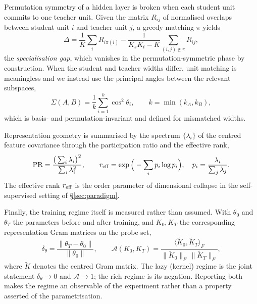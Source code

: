 Permutation symmetry of a hidden layer is broken when each student unit commits
to one teacher unit. Given the matrix $R_{ij}$ of normalised overlaps between
student unit $i$ and teacher unit $j$, a greedy matching $\pi$ yields
\begin{equation}
  \Delta=\frac{1}{K}\sum_{i}R_{i\pi(i)}
        -\frac{1}{K_sK_t-K}\sum_{(i,j)\notin\pi}R_{ij},
  \label{eq:specgap}
\end{equation}
the \emph{specialisation gap}, which vanishes in the permutation-symmetric
phase by construction. When the student and teacher widths differ, unit
matching is meaningless and we instead use the principal angles between the
relevant subspaces,
\begin{equation}
  \Sigma(A,B)=\frac{1}{k}\sum_{i=1}^{k}\cos^2\theta_i,
  \qquad k=\min(k_A,k_B),
  \label{eq:subspace}
\end{equation}
which is basis- and permutation-invariant and defined for mismatched widths.

Representation geometry is summarised by the spectrum $\{\lambda_i\}$ of the
centred feature covariance through the participation ratio and the effective
rank,
\begin{equation}
  \mathrm{PR}=\frac{\big(\sum_i\lambda_i\big)^2}{\sum_i\lambda_i^2},
  \qquad
  r_{\rm eff}=\exp\Big(-\sum_i p_i\log p_i\Big),\quad
  p_i=\frac{\lambda_i}{\sum_j\lambda_j}.
  \label{eq:effrank}
\end{equation}
The effective rank $r_{\rm eff}$ is the order parameter of dimensional collapse
in the self-supervised setting of \S\ref{sec:paradigm}.

Finally, the training regime itself is measured rather than assumed. With
$\theta_0$ and $\theta_T$ the parameters before and after training, and
$K_0,K_T$ the corresponding representation Gram matrices on the probe set,
\begin{equation}
  \delta_\theta=\frac{\lVert\theta_T-\theta_0\rVert}{\lVert\theta_0\rVert},
  \qquad
  \mathcal A(K_0,K_T)=
  \frac{\langle \tilde K_0,\tilde K_T\rangle_F}
       {\lVert \tilde K_0\rVert_F\,\lVert \tilde K_T\rVert_F},
  \label{eq:lazy}
\end{equation}
where $\tilde K$ denotes the centred Gram matrix. The lazy (kernel) regime is
the joint statement $\delta_\theta\to0$ and $\mathcal A\to1$; the rich regime
is its negation. Reporting both makes the regime an observable of the
experiment rather than a property asserted of the parametrisation.
